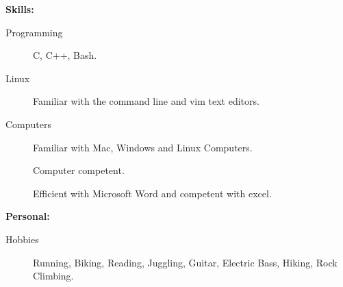 \documentclass[11pt]{article}
\begin{document}
{\Large \bf Skills:}
\begin{description}

    \item[Programming]
        C, C++, Bash.

    \item[Linux]
        Familiar with the command line and vim text editors.
        
    \item[Computers]
        Familiar with Mac, Windows and Linux Computers.
        
        Computer competent.

        Efficient with Microsoft Word and competent with excel.
    
\end{description}
{\Large \bf Personal:}
\begin{description}
    \item[Hobbies]
        Running, Biking, Reading, Juggling, Guitar, Electric Bass, Hiking,
        Rock Climbing.

\end{description}
\end{document}
